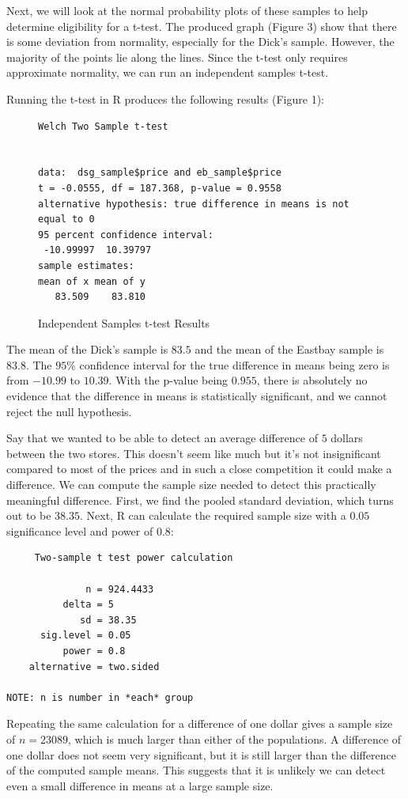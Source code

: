 \documentclass[12pt]{article}
\begin{document}
Next, we will look at the normal probability plots of these samples to help determine eligibility for a t-test. The produced graph (Figure 3) show that there is some deviation from normality,
especially for the Dick's sample. However, the majority of the points lie along the lines. Since the t-test only requires approximate normality, we can run an independent samples
t-test.

Running the t-test in R produces the following results (Figure 1):

\begin{figure}[h]
\begin{verbatim}
Welch Two Sample t-test


data:  dsg_sample$price and eb_sample$price
t = -0.0555, df = 187.368, p-value = 0.9558
alternative hypothesis: true difference in means is not equal to 0
95 percent confidence interval:
 -10.99997  10.39797
sample estimates:
mean of x mean of y 
   83.509    83.810 
\end{verbatim}
\caption{Independent Samples t-test Results}
\end{figure}

The mean of the Dick's sample is $83.5$ and the mean of the Eastbay sample is $83.8$. The $95\%$ confidence interval for the true difference in means being zero is from $-10.99$ to
$10.39$. With the p-value being $0.955$, there is absolutely no evidence that the difference in means is statistically significant, and we cannot reject the null hypothesis.

Say that we wanted to be able to detect an average difference of $5$ dollars between the two stores. This doesn't seem like much but it's not insignificant compared to most of the
prices and in such a close competition it could make a difference. We can compute the sample size needed to detect this practically meaningful difference. First, we find the pooled
standard deviation, which turns out to be $38.35$. Next, R can calculate the required sample size with a $0.05$ significance level and power of $0.8$:

\begin{verbatim}
     Two-sample t test power calculation 

              n = 924.4433
          delta = 5
             sd = 38.35
      sig.level = 0.05
          power = 0.8
    alternative = two.sided

NOTE: n is number in *each* group
\end{verbatim}

Repeating the same calculation for a difference of one dollar gives a sample size of $n=23089$, which is much larger than either of the populations. A difference of one dollar does not
seem very significant, but it is still larger than the difference of the computed sample means. This suggests that it is unlikely we can detect even a small difference in means at a large sample size.
\end{document}
